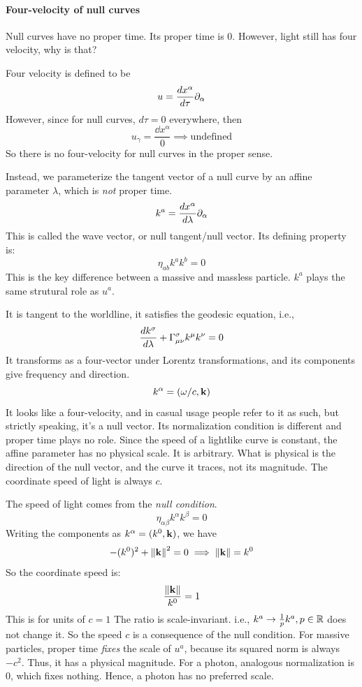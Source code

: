 		\paragraph{Four-velocity of null curves}
			Null curves have no proper time. Its proper time is 0. However,
			light still has four velocity, why is that?

			Four velocity is defined to be 
			\[
				u = \dv{x^\alpha}{\tau}\partial_\alpha 
			\]
			However, since for null curves, $d\tau=0$ everywhere, then
			\[
				u_\gamma = \frac{\dd{x^\alpha}}{0} \implies \text{undefined} 
			\]
			So there is no four-velocity for null curves in the proper sense.

			Instead, we parameterize the tangent vector of a null curve
			by an affine parameter $\lambda$, which is \textit{not} proper time.
			\[
				k^a = \dv{x^\alpha}{\lambda}\partial_\alpha 
			\]
			This is called the wave vector, or null tangent/null vector. 
			Its defining property is:
			\[
				\eta_{ab} k^a k^b = 0 
			\]
			This is the key difference between a massive and 
			massless particle. $k^a$ plays the same strutural
			role as $u^a$.

			It is tangent to the worldline, it satisfies the geodesic equation, i.e.,
			\[
				\dv{k^\sigma}{\lambda} + \Gamma^{\sigma}_{\mu\nu} k^\mu k^\nu = 0 
			\]
			It transforms as a four-vector under Lorentz transformations,
			and its components give frequency and direction.
			\[
				k^\alpha = (\omega/c, \vb{k})
			\]
			It looks like a four-velocity, and in casual usage people refer
			to it as such, but strictly speaking, it's a null vector.
			Its normalization condition is different and proper time plays no role.
			Since the speed of a lightlike curve is constant, the affine parameter
			has no physical scale. It is arbitrary. What is physical is the direction
			of the null vector, and the curve it traces, not its magnitude. The coordinate
			speed of light is always $c$.

			The speed of light comes from the \textit{null condition}.
			\[
				\eta_{\alpha\beta} k^\alpha k^\beta = 0
			\]
			Writing the components as $k^\alpha = (k^0, \vb{k})$, we have
			\[
				-(k^0)^2 + \norm{\vb{k}}^2 = 0 \implies \norm{\vb{k}} = k^0
			\]
			So the coordinate speed is:
			\[
				\frac{\norm{\vb{k}}}{k^0} = 1
			\]
			This is for units of $c=1$
			The ratio is scale-invariant. i.e., $k^a \to \frac{1}{p}k^a, p\in\mathbb{R}$ does not
			change it. So the speed $c$ is a consequence of the null condition. For massive
			particles, proper time \textit{fixes} the scale of $u^a$, because its squared norm 
			is always $-c^2$. Thus, it has a physical magnitude. For a photon, analogous
			normalization is 0, which fixes nothing. Hence, a photon has 
			no preferred scale.


